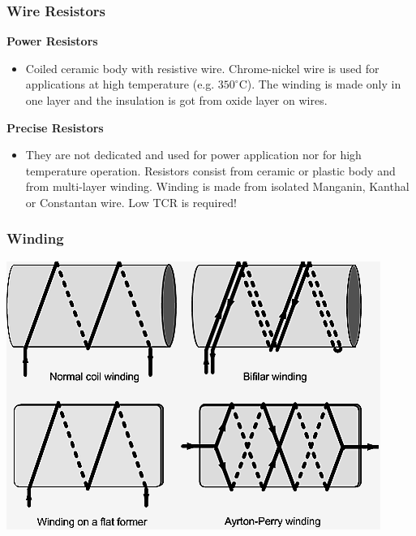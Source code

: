 \documentclass{beamer}
\begin{document}
	\begin{frame}
    \frametitle{Wire Resistors}
		\textbf{Power Resistors}
		\begin{itemize}
			\item Coiled ceramic body with resistive wire. Chrome-nickel wire is used for applications at high temperature (e.g. $350^\circ$C). The winding is made only in one layer and the insulation is got from oxide layer on wires. 
		\end{itemize}
		
		\textbf{Precise Resistors}
		\begin{itemize}
			\item They are not dedicated and used for power application nor for high temperature operation. Resistors consist from ceramic or plastic body and from multi-layer winding. Winding is made from isolated Manganin, Kanthal or Constantan wire. Low TCR is required!
		\end{itemize}
		\textbf{\color{red}{coil $\Rightarrow$ large parasitic inductance}}
  \end{frame}
	\begin{frame}
    \frametitle{Winding}
		\begin{center}
		\includegraphics[scale=0.7]{obr09_vinuti.png}\\
		\end{center}
  \end{frame}
\end{document}

